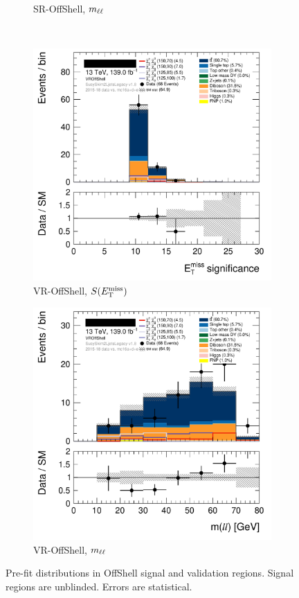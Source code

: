 \begin{figure}[tp]
\begin{subfigure}{0.495\textwidth}
\caption{SR-OffShell, $m_{\ell\ell}$}
\end{subfigure}
\\[0.5em]
\begin{subfigure}{0.495\textwidth}
\centering
\includegraphics[width=\textwidth]{figures/2ljets_def_met_Sign_VROffShell.png}
\caption{VR-OffShell, $S(E_\mathrm{T}^\mathrm{miss})$}
\end{subfigure}
\hfill
\begin{subfigure}{0.495\textwidth}
\centering
\includegraphics[width=\textwidth]{figures/2ljets_def_mll_VROffShell.png}
\caption{VR-OffShell, $m_{\ell\ell}$}
\end{subfigure}
\caption[
Pre-fit distributions in OffShell signal and validation regions
]{%
Pre-fit distributions in OffShell signal and validation regions.
Signal regions are unblinded.
Errors are statistical.
}
\label{fig:2ljets_offshell_region}
\end{figure}

